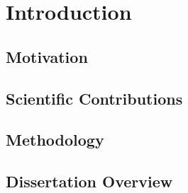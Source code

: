

\chapter{Introduction}
\label{ch:introduction}
\lipsum[10-11]


\section{Motivation}
\label{ch:motivation}
\lipsum[12-13]


\section{Scientific Contributions}
\label{ch:contributions}
\lipsum[14-15]


\section{Methodology}
\label{ch:methodology}
\lipsum[16-17]


\section{Dissertation Overview}
\label{ch:overview}
\lipsum[18-19]
